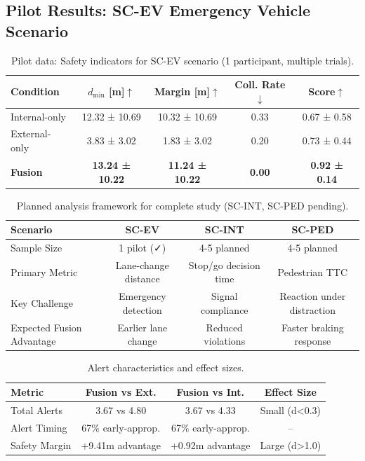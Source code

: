 \subsection*{Pilot Results: SC-EV Emergency Vehicle Scenario}

\begin{table}[H]
\centering
\footnotesize
\caption{Pilot data: Safety indicators for SC-EV scenario (1 participant, multiple trials).}
\label{tab:safety}
\begin{tabular}{@{}lcccc@{}}
\toprule
Condition & $d_{\min}$ [m]$\uparrow$ & Margin [m]$\uparrow$ & Coll. Rate$\downarrow$ & Score$\uparrow$\\
\midrule
Internal-only & 12.32 ± 10.69 & 10.32 ± 10.69 & 0.33 & 0.67 ± 0.58\\
External-only & 3.83 ± 3.02 & 1.83 ± 3.02 & 0.20 & 0.73 ± 0.44\\
\textbf{Fusion} & \textbf{13.24 ± 10.22} & \textbf{11.24 ± 10.22} & \textbf{0.00} & \textbf{0.92 ± 0.14}\\
\bottomrule
\end{tabular}
\end{table}

\begin{table}[H]
\centering
\footnotesize
\caption{Planned analysis framework for complete study (SC-INT, SC-PED pending).}
\label{tab:planned}
\begin{tabular}{@{}lccc@{}}
\toprule
Scenario & \textbf{SC-EV} & \textbf{SC-INT} & \textbf{SC-PED}\\
\midrule
Sample Size & 1 pilot (✓) & 4-5 planned & 4-5 planned\\
Primary Metric & Lane-change distance & Stop/go decision time & Pedestrian TTC\\
Key Challenge & Emergency detection & Signal compliance & Reaction under distraction\\
Expected Fusion Advantage & Earlier lane change & Reduced violations & Faster braking response\\
\bottomrule
\end{tabular}
\end{table}

\begin{table}[H]
\centering
\footnotesize
\caption{Alert characteristics and effect sizes.}
\label{tab:alerts}
\begin{tabular}{@{}lccc@{}}
\toprule
Metric & Fusion vs Ext. & Fusion vs Int. & Effect Size\\
\midrule
Total Alerts & 3.67 vs 4.80 & 3.67 vs 4.33 & Small (d<0.3)\\
Alert Timing & 67\% early-approp. & 67\% early-approp. & --\\
Safety Margin & +9.41m advantage & +0.92m advantage & Large (d>1.0)\\
\bottomrule
\end{tabular}
\end{table}

